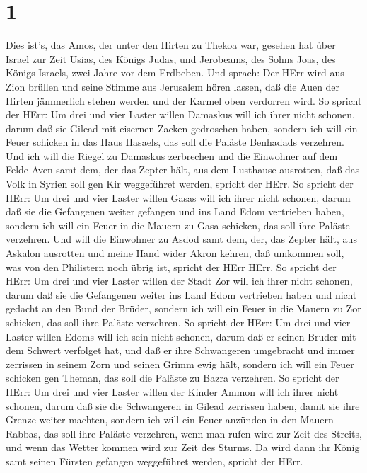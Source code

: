\hypertarget{section}{%
\section{1}\label{section}}

 Dies ist's, das Amos, der unter den Hirten zu Thekoa war,
gesehen hat über Israel zur Zeit Usias, des Königs Judas, und Jerobeams,
des Sohns Joas, des Königs Israels, zwei Jahre vor dem Erdbeben.
 Und sprach: Der HErr wird aus Zion brüllen und seine Stimme
aus Jerusalem hören lassen, daß die Auen der Hirten jämmerlich stehen
werden und der Karmel oben verdorren wird.  So spricht der
HErr: Um drei und vier Laster willen Damaskus will ich ihrer nicht
schonen, darum daß sie Gilead mit eisernen Zacken gedroschen haben,
 sondern ich will ein Feuer schicken in das Haus Hasaels,
das soll die Paläste Benhadads verzehren.  Und ich will die
Riegel zu Damaskus zerbrechen und die Einwohner auf dem Felde Aven samt
dem, der das Zepter hält, aus dem Lusthause ausrotten, daß das Volk in
Syrien soll gen Kir weggeführet werden, spricht der HErr. 
So spricht der HErr: Um drei und vier Laster willen Gasas will ich ihrer
nicht schonen, darum daß sie die Gefangenen weiter gefangen und ins Land
Edom vertrieben haben,  sondern ich will ein Feuer in die
Mauern zu Gasa schicken, das soll ihre Paläste verzehren. 
Und will die Einwohner zu Asdod samt dem, der, das Zepter hält, aus
Askalon ausrotten und meine Hand wider Akron kehren, daß umkommen soll,
was von den Philistern noch übrig ist, spricht der HErr HErr.
 So spricht der HErr: Um drei und vier Laster willen der
Stadt Zor will ich ihrer nicht schonen, darum daß sie die Gefangenen
weiter ins Land Edom vertrieben haben und nicht gedacht an den Bund der
Brüder,  sondern ich will ein Feuer in die Mauern zu Zor
schicken, das soll ihre Paläste verzehren.  So spricht der
HErr: Um drei und vier Laster willen Edoms will ich sein nicht schonen,
darum daß er seinen Bruder mit dem Schwert verfolget hat, und daß er
ihre Schwangeren umgebracht und immer zerrissen in seinem Zorn und
seinen Grimm ewig hält,  sondern ich will ein Feuer
schicken gen Theman, das soll die Paläste zu Bazra verzehren.
 So spricht der HErr: Um drei und vier Laster willen der
Kinder Ammon will ich ihrer nicht schonen, darum daß sie die Schwangeren
in Gilead zerrissen haben, damit sie ihre Grenze weiter machten,
 sondern ich will ein Feuer anzünden in den Mauern Rabbas,
das soll ihre Paläste verzehren, wenn man rufen wird zur Zeit des
Streits, und wenn das Wetter kommen wird zur Zeit des Sturms.
 Da wird dann ihr König samt seinen Fürsten gefangen
weggeführet werden, spricht der HErr.

